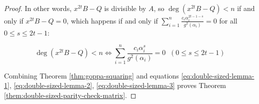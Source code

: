 \documentclass[runningheads]{llncs}
\begin{document}
\begin{proof}
    In other words, $x^{2t}B - Q$ is divisible by $A$, so $\deg(x^{2t}B - Q) < n$ if and only if $x^{2t}B - Q = 0$, which happens if and only if $\sum_{i=1}^{n}\frac{c_i\alpha_i^{2t-1-s}}{g^2(\alpha_i)} = 0$ for all $0\leq s \leq 2t-1$:

    \begin{equation}\label{eq:double-sized-lemma-3}
        \deg(x^{2t}B - Q) < n \Longleftrightarrow \sum_{i=1}^{n}\frac{c_i\alpha_i^s}{g^2(\alpha_i)} = 0 \;\;(0 \leq s \leq 2t-1)
    \end{equation}

    Combining Theorem \ref{thm:goppa-squaring} and equations \ref{eq:double-sized-lemma-1}, \ref{eq:double-sized-lemma-2}, \ref{eq:double-sized-lemma-3} proves Theorem \ref{them:double-sized-parity-check-matrix}.
\end{proof}

%
%


\end{document}
